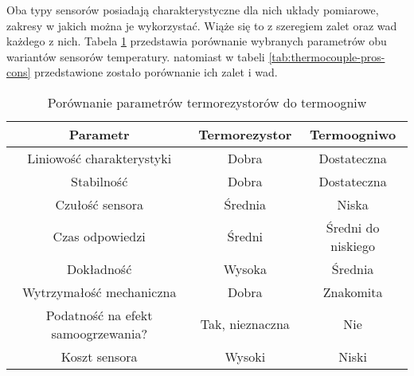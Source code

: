 Oba typy sensorów posiadają charakterystyczne dla nich układy pomiarowe, zakresy w jakich można je
wykorzystać. Wiąże się to z szeregiem zalet oraz wad każdego z nich. Tabela
\ref{tab:rtd-vs-thermocouple} przedstawia porównanie wybranych parametrów obu wariantów sensorów
temperatury. natomiast w tabeli \ref{tab:thermocouple-pros-cons} przedstawione zostało porównanie
ich zalet i wad.
\begin{table}[!htbp]
  \centering
  \caption{\label{tab:rtd-vs-thermocouple}Porównanie parametrów termorezystorów do termoogniw}
  \begin{tabular}{ccc}
    \toprule
    Parametr                           & Termorezystor   & Termoogniwo        \\
    \midrule
    Liniowość charakterystyki          & Dobra           & Dostateczna        \\
    Stabilność                         & Dobra           & Dostateczna        \\
    Czułość sensora                    & Średnia         & Niska              \\
    Czas odpowiedzi                    & Średni          & Średni do niskiego \\
    Dokładność                         & Wysoka          & Średnia            \\
    Wytrzymałość mechaniczna           & Dobra           & Znakomita          \\
    Podatność na efekt samoogrzewania? & Tak, nieznaczna & Nie                \\
    Koszt sensora                      & Wysoki          & Niski              \\
    \bottomrule
  \end{tabular}
\end{table}

